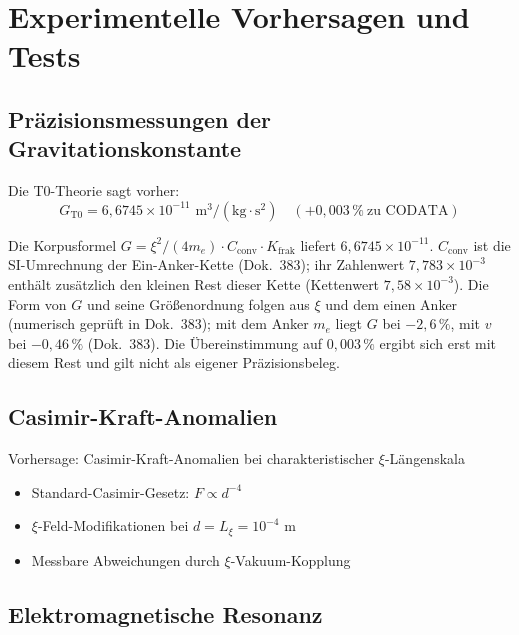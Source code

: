 	\section{Experimentelle Vorhersagen und Tests}
	
	\subsection{Präzisionsmessungen der Gravitationskonstante}
	
	Die T0-Theorie sagt vorher:
	\begin{equation}
		G_{\text{T0}} = 6{,}6745 \times 10^{-11} \text{ m}^3/(\text{kg} \cdot \text{s}^2) \quad (+0{,}003\,\%\ \text{zu CODATA})
	\end{equation}
	
	Die Korpusformel $G = \xi^2/(4m_e)\cdot C_{\text{conv}}\cdot K_{\text{frak}}$ liefert $6{,}6745\times10^{-11}$. $C_{\text{conv}}$ ist die SI-Umrechnung der Ein-Anker-Kette (Dok.~383); ihr Zahlenwert $7{,}783\times10^{-3}$ enthält zusätzlich den kleinen Rest dieser Kette (Kettenwert $7{,}58\times10^{-3}$). Die Form von $G$ und seine Größenordnung folgen aus $\xi$ und dem einen Anker (numerisch geprüft in Dok.~383); mit dem Anker $m_e$ liegt $G$ bei $-2{,}6\,\%$, mit $v$ bei $-0{,}46\,\%$ (Dok.~383). Die Übereinstimmung auf $0{,}003\,\%$ ergibt sich erst mit diesem Rest und gilt nicht als eigener Präzisionsbeleg.
	
	\subsection{Casimir-Kraft-Anomalien}
	
	\begin{experiment}
		Vorhersage: Casimir-Kraft-Anomalien bei charakteristischer $\xi$-Längenskala
		\begin{itemize}
			\item Standard-Casimir-Gesetz: $F \propto d^{-4}$
			\item $\xi$-Feld-Modifikationen bei $d = L_\xi = 10^{-4}$ m
			\item Messbare Abweichungen durch $\xi$-Vakuum-Kopplung
		\end{itemize}
	\end{experiment}
	
	\subsection{Elektromagnetische Resonanz}
	
